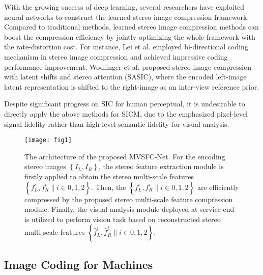 With the growing success of deep learning, several researchers have exploited neural networks to construct the learned stereo image compression framework. Compared to traditional methods, learned stereo image compression methods can boost the compression efficiency \textcolor[rgb]{0,0,0}{by jointly optimizing the whole framework with the rate-distortion cost}. For instance,  Lei et al. \cite{2022-BCSIC} employed bi-directional coding mechanism in stereo image compression and achieved impressive coding performance improvement. Wodlinger et al.  \cite{2022-SASIC} proposed stereo image compression with latent shifts and stereo attention (SASIC), where the encoded left-image latent representation is shifted to the \textcolor[rgb]{0,0,0}{right-image as an inter-view reference prior}.

Despite significant progress on SIC for human perceptual, it is undesirable to directly apply the above methods for SICM, due to the emphasized pixel-level signal fidelity rather than high-level semantic fidelity for visual analysis.

\begin{figure*}[htbp]
	\centering
	\texttt{[image: fig1]}
	\caption{\textcolor[rgb]{0,0,0}{The architecture of the proposed MVSFC-Net. For the encoding stereo images $ \left\{I_{L}, I_{R}\right\} $, the stereo feature extraction module is firstly applied to obtain the stereo multi-scale features $ \left\{f_{L}^{i}, f_{R}^{i}\|i\in 0,1,2\right\} $. Then, the $ \left\{f_{L}^{i}, f_{R}^{i}\|i\in 0,1,2\right\} $ are efficiently compressed by the proposed stereo multi-scale feature compression module. Finally, the visual analysis module deployed at service-end is utilized to perform vision task based on reconstructed stereo multi-scale features $ \left\{\hat{f}_{L}^{i}, \hat{f}_{R}^{i}\|i\in 0,1,2\right\} $}.}
	
	\label{fig1}
\end{figure*}

\subsection{Image Coding for Machines}


